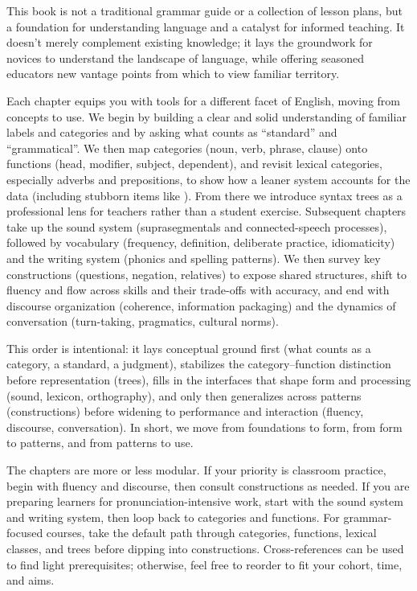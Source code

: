 \addchap{\lsPrefaceTitle} \label{ch:preface}

This book is not a traditional grammar guide or a collection of lesson plans, but a foundation for understanding language and a catalyst for informed teaching. It doesn't merely complement existing knowledge; it lays the groundwork for novices to understand the landscape of language, while offering seasoned educators new vantage points from which to view familiar territory.

Each chapter equips you with tools for a different facet of English, moving from concepts to use. We begin by building a clear and solid understanding of familiar labels and categories and by asking what counts as \enquote{standard} and \enquote{grammatical}. We then map categories (noun, verb, phrase, clause) onto functions (head, modifier, subject, dependent), and revisit lexical categories, especially adverbs and prepositions, to show how a leaner system accounts for the data (including stubborn items like ). From there we introduce syntax trees as a professional lens for teachers rather than a student exercise. Subsequent chapters take up the sound system (suprasegmentals and connected-speech processes), followed by vocabulary (frequency, definition, deliberate practice, idiomaticity) and the writing system (phonics and spelling patterns). We then survey key constructions (questions, negation, relatives) to expose shared structures, shift to fluency and flow across skills and their trade-offs with accuracy, and end with discourse organization (coherence, information packaging) and the dynamics of conversation (turn-taking, pragmatics, cultural norms).

This order is intentional: it lays conceptual ground first (what counts as a category, a standard, a judgment), stabilizes the category–function distinction before representation (trees), fills in the interfaces that shape form and processing (sound, lexicon, orthography), and only then generalizes across patterns (constructions) before widening to performance and interaction (fluency, discourse, conversation). In short, we move from foundations to form, from form to patterns, and from patterns to use.

The chapters are more or less modular. If your priority is classroom practice, begin with fluency and discourse, then consult constructions as needed. If you are preparing learners for pronunciation-intensive work, start with the sound system and writing system, then loop back to categories and functions. For grammar-focused courses, take the default path through categories, functions, lexical classes, and trees before dipping into constructions. Cross-references can be used to find light prerequisites; otherwise, feel free to reorder to fit your cohort, time, and aims.


